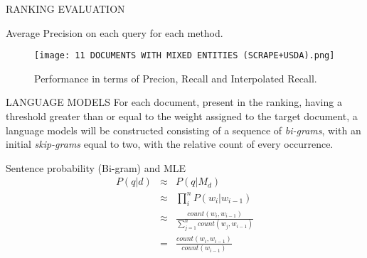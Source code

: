 \begin{frame}{RANKING EVALUATION}
\begin{minipage}{\linewidth}
\begin{minipage}{0.50\linewidth}
\begin{table}[]
                \caption{Average Precision on each query for each method.}
                \label{avgp}
                \centering
            \end{table}
        \end{minipage}
        \begin{minipage}{0.40\linewidth}
            \begin{figure}[htbp]
                \centering
                \texttt{[image: 11 DOCUMENTS WITH MIXED ENTITIES (SCRAPE+USDA).png]}
                \centering
                \caption{Performance in terms of Precion, Recall and Interpolated Recall.}
                \label{Performance mixed approach}
                \centering
            \end{figure}
        \end{minipage}
    \end{minipage}
\end{frame}

\begin{frame}{LANGUAGE MODELS}
    For each document, present in the ranking, having a threshold greater 
    than or equal to the weight assigned to the target document, a language 
    models will be constructed consisting of a sequence of \emph{bi-grams}, with an 
    initial \emph{skip-grams} equal to two, with the relative count of every 
    occurrence.    
    \begin{block}{\centering Sentence probability (Bi-gram) and MLE}
        \begin{eqnarray}\label{MLE}
            P(q|d) & \approx & P(q|M_d) \nonumber \\
                   & \approx & \prod_i^n{P(w_i|w_{i-1})} \nonumber \\
                   & \approx & \frac{count(w_i,w_{i-1})}{\sum_{j=1}^n count(w_j,w_{i-1})} \nonumber \\
                   & = & \frac{count(w_i, w_{i-1})}{count(w_{i-1})}
        \end{eqnarray}
    \end{block}
\end{frame}

